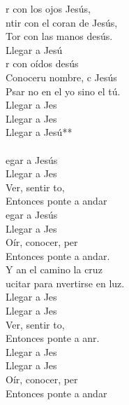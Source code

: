 \begin{cancion}%
	r con los ojos Jesús,\\
	ntir con el coran de Jesús,\\
	Tor con las manos desús.\\
	Llegar a Jesú   \\
	r con oídos desús \\
	Conoceru nombre, c Jesús\\
	Psar no en el yo sino el tú.\\
	Llegar a Jes \\
	Llegar a Jes\\
	Llegar a Jesú**\\
\jump\\
	egar a Jesús\\
	Llegar a Jes\\
	Ver, sentir to,    \\
	Entonces ponte a andar\\
	egar a Jesús\\
	Llegar a Jes\\
	Oír, conocer, per   \\
	Entonces ponte a andar.\\
	Y an el camino  la cruz\\
	ucitar para nvertirse en luz.\\
	Llegar a Jes \\
	Llegar a Jes\\
	Ver, sentir to,    \\
	Entonces ponte a anr.\\
	Llegar a Jes \\
	Llegar a Jes\\
	Oír, conocer, per   \\
	Entonces ponte a andar\\
\end{cancion}%
